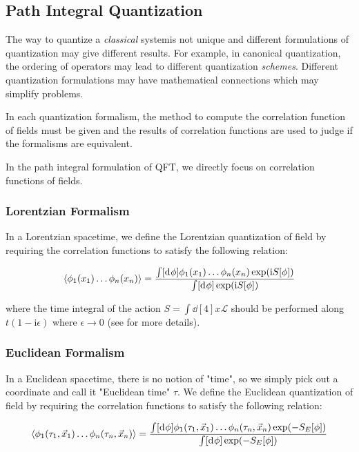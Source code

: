 \documentclass[10pt]{article}
\newcommand{\ii}{\mathrm{i}}
\newenvironment{boxmath}[1]{\begin{tcolorbox}[enhanced,attach boxed title to top center={yshift=-\tcboxedtitleheight/2},boxrule=1pt,title={\centering #1},colframe=NavyBlue!70!black,colback=NavyBlue!10,colbacktitle=NavyBlue!10,fonttitle=\scshape,coltitle=Black]}{\end{tcolorbox}}
\begin{document}
\subsection{Path Integral Quantization}
\begin{intu}
    The way to quantize a \textit{classical} system\snm is not unique and different formulations of quantization may give different results.
    For example, in canonical quantization, the ordering of operators may lead to different quantization \textit{schemes}.
    Different quantization formulations may have mathematical connections which may simplify problems.

    In each quantization formalism, the method to compute the correlation function of fields must be given and the results of correlation functions are used to judge if the formalisms are equivalent.
\end{intu}
In the path integral formulation of QFT, we directly focus on correlation functions of fields.
\subsubsection{Lorentzian Formalism}
In a Lorentzian spacetime, we define the Lorentzian quantization of field by requiring the correlation functions to satisfy the following relation:
\begin{boxmath}{Lorentzian Path Integral Quantization}
    \begin{align}
        \expval{\phi_1(x_1)\dots\phi_n(x_n)}=\frac{\int [\dd[]{\phi}]\phi_1(x_1)\dots\phi_n(x_n)\exp(\ii S[\phi])}{\int[\dd[]{\phi}]\exp(\ii S[\phi])}
    \end{align}
\end{boxmath}
where the time integral of the action $S=\int\dd[4]{x}\mathcal{L}$ should be performed along $t(1-\ii\epsilon)$ where $\epsilon\to0$ (see \cite{Peskin:1995ev} for more details).
\subsubsection{Euclidean Formalism}
In a Euclidean spacetime, there is no notion of "time", so we simply pick out a coordinate and call it "Euclidean time" $\tau$.
We define the Euclidean quantization of field by requiring the correlation functions to satisfy the following relation:
\begin{boxmath}{Euclidean Path Integral Quantization}
    \begin{align}
        \expval{\phi_1(\tau_1,\vec{x}_1)\dots\phi_n(\tau_n,\vec{x}_n)}=\frac{\int [\dd[]{\phi}]\phi_1(\tau_1,\vec{x}_1)\dots\phi_n(\tau_n,\vec{x}_n)\exp(-S_E[\phi])}{\int [\dd[]{\phi}]\exp(-S_E[\phi])}
    \end{align}
\end{boxmath}
\end{document}
